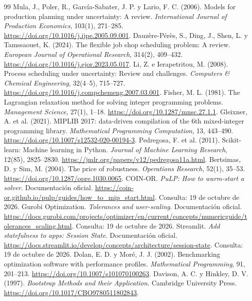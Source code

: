 \documentclass[12pt,a4paper,oneside]{article}
\begin{document}
\begin{thebibliography}{99}
 Mula, J., Poler, R., García-Sabater, J. P. y Lario, F. C. (2006). Models for production planning under uncertainty: A review. \textit{International Journal of Production Economics}, 103(1), 271--285. \url{https://doi.org/10.1016/j.ijpe.2005.09.001}.
 Dauzère-Pérès, S., Ding, J., Shen, L. y Tamssaouet, K. (2024). The flexible job shop scheduling problem: A review. \textit{European Journal of Operational Research}, 314(2), 409--432. \url{https://doi.org/10.1016/j.ejor.2023.05.017}.
 Li, Z. e Ierapetritou, M. (2008). Process scheduling under uncertainty: Review and challenges. \textit{Computers \& Chemical Engineering}, 32(4--5), 715--727. \url{https://doi.org/10.1016/j.compchemeng.2007.03.001}.
 Fisher, M. L. (1981). The Lagrangian relaxation method for solving integer programming problems. \textit{Management Science}, 27(1), 1--18. \url{https://doi.org/10.1287/mnsc.27.1.1}.
 Gleixner, A. et al. (2021). MIPLIB 2017: data-driven compilation of the 6th mixed-integer programming library. \textit{Mathematical Programming Computation}, 13, 443--490. \url{https://doi.org/10.1007/s12532-020-00194-3}.
 Pedregosa, F. et al. (2011). Scikit-learn: Machine learning in Python. \textit{Journal of Machine Learning Research}, 12(85), 2825--2830. \url{https://jmlr.org/papers/v12/pedregosa11a.html}.
 Bertsimas, D. y Sim, M. (2004). The price of robustness. \textit{Operations Research}, 52(1), 35--53. \url{https://doi.org/10.1287/opre.1030.0065}.
 COIN-OR. \textit{PuLP: How to warm-start a solver}. Documentación oficial. \url{https://coin-or.github.io/pulp/guides/how_to_mip_start.html}. Consulta: 19 de octubre de 2026.
 Gurobi Optimization. \textit{Tolerances and user-scaling}. Documentación oficial. \url{https://docs.gurobi.com/projects/optimizer/en/current/concepts/numericguide/tolerances_scaling.html}. Consulta: 19 de octubre de 2026.
 Streamlit. \textit{Add statefulness to apps: Session State}. Documentación oficial. \url{https://docs.streamlit.io/develop/concepts/architecture/session-state}. Consulta: 19 de octubre de 2026.
 Dolan, E. D. y Moré, J. J. (2002). Benchmarking optimization software with performance profiles. \textit{Mathematical Programming}, 91, 201--213. \url{https://doi.org/10.1007/s101070100263}.
 Davison, A. C. y Hinkley, D. V. (1997). \textit{Bootstrap Methods and their Application}. Cambridge University Press. \url{https://doi.org/10.1017/CBO9780511802843}.
\end{thebibliography}
\label{finprincipal}
\clearpage
\appendix
{}\small
\renewcommand{\thepage}{A-\arabic{page}}\setcounter{page}{1}
\end{document}
